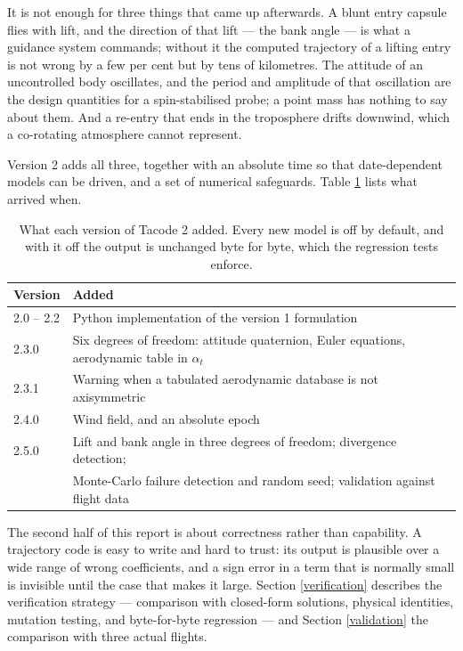 \documentclass[11pt,a4paper]{article}
\begin{document}
It is not enough for three things that came up afterwards. A blunt entry capsule flies
with lift, and the direction of that lift --- the bank angle --- is what a guidance system
commands; without it the computed trajectory of a lifting entry is not wrong by a few per
cent but by tens of kilometres. The attitude of an uncontrolled body oscillates, and the
period and amplitude of that oscillation are the design quantities for a spin-stabilised
probe; a point mass has nothing to say about them. And a re-entry that ends in the
troposphere drifts downwind, which a co-rotating atmosphere cannot represent.

Version 2 adds all three, together with an absolute time so that date-dependent models can
be driven, and a set of numerical safeguards. Table \ref{version_history} lists what
arrived when.

\begin{table}[h]
\caption{What each version of Tacode 2 added. Every new model is off by default, and with
it off the output is unchanged byte for byte, which the regression tests enforce.}
\label{version_history}
\begin{center}
\small
\begin{tabular}{l|l}
\hline \hline
Version & Added \\
\hline
2.0 -- 2.2 & Python implementation of the version 1 formulation \\
2.3.0 & Six degrees of freedom: attitude quaternion, Euler equations, aerodynamic table in $\alpha_t$ \\
2.3.1 & Warning when a tabulated aerodynamic database is not axisymmetric \\
2.4.0 & Wind field, and an absolute epoch \\
2.5.0 & Lift and bank angle in three degrees of freedom; divergence detection; \\
      & Monte-Carlo failure detection and random seed; validation against flight data \\
\hline \hline
\end{tabular}
\end{center}
\end{table}

The second half of this report is about correctness rather than capability. A trajectory
code is easy to write and hard to trust: its output is plausible over a wide range of
wrong coefficients, and a sign error in a term that is normally small is invisible until
the case that makes it large. Section \ref{verification} describes the verification
strategy --- comparison with closed-form solutions, physical identities, mutation testing,
and byte-for-byte regression --- and Section \ref{validation} the comparison with three
actual flights.
\end{document}
